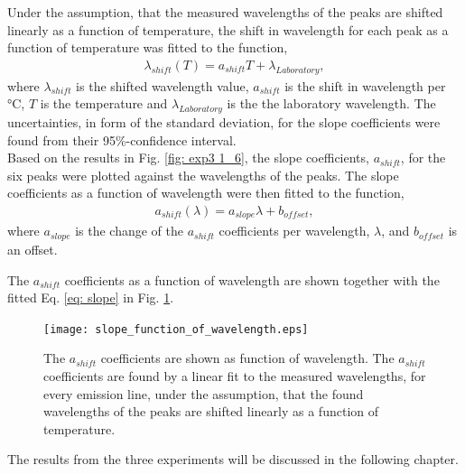 Under the assumption, that the measured wavelengths of the peaks are shifted linearly as a function of temperature, the shift in wavelength for each peak  as a function of temperature was fitted to the function,
\begin{align}
\lambda_{shift}(T) = a_{shift} T + \lambda_{Laboratory}, 
\end{align}
where $\lambda_{shift}$ is the shifted wavelength value, $a_{shift}$ is the shift in wavelength per °C, $ T$ is the temperature and $\lambda_{Laboratory}$ is the the laboratory wavelength. The uncertainties, in form of the standard deviation, for the slope coefficients were found from their 95\%-confidence interval. 
\\
Based on the results in Fig. \ref{fig: exp3 1_6}, the slope coefficients, $a_{shift}$, for the six peaks were plotted against the wavelengths of the peaks. The slope coefficients as a function of wavelength were then fitted to the function,
\begin{align}
a_{shift}(\lambda) =  a_{slope} \lambda + b_{offset}, 
\label{eq: slope}
\end{align}
where $a_{slope}$ is the change of the $a_{shift}$ coefficients per wavelength, $\lambda$, and $b_{offset}$ is an offset.

The $a_{shift}$ coefficients as a function of wavelength are shown together with the fitted Eq. \ref{eq: slope} in Fig. \ref{fig: exp3 slope coeff.}.

\begin{figure}[!h]
\centering
\texttt{[image: slope\_function\_of\_wavelength.eps]}
\caption{The $a_{shift}$ coefficients are shown as function of wavelength. The $a_{shift}$ coefficients are found by a linear fit to the measured wavelengths, for every emission line, under the assumption, that the found wavelengths of the peaks are shifted linearly as a function of temperature.}
\label{fig: exp3 slope coeff.}
\end{figure}

The results from the three experiments will be discussed in the following chapter.





